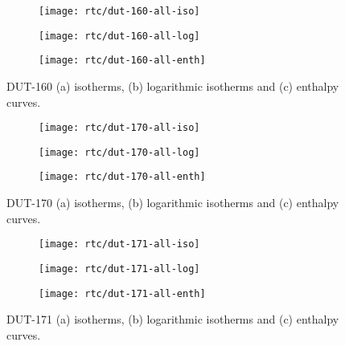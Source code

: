 \begin{figure}[H]
    \centering
    \begin{subfigure}{0.33\linewidth}
        \texttt{[image: rtc/dut-160-all-iso]}%
        \caption{}
    \end{subfigure}%
    \begin{subfigure}{0.33\linewidth}
        \texttt{[image: rtc/dut-160-all-log]}%
        \caption{}
    \end{subfigure}%
    \begin{subfigure}{0.33\linewidth}
        \texttt{[image: rtc/dut-160-all-enth]}%
        \caption{}
    \end{subfigure}%
    \caption{DUT-160 (a) isotherms, (b) logarithmic isotherms and 
    (c) enthalpy curves.}%
    \label{appx:dut:fig:dut-160-butane-rtc}
\end{figure}

\begin{figure}[H]
    \centering
    \begin{subfigure}{0.33\linewidth}
        \texttt{[image: rtc/dut-170-all-iso]}%
        \caption{}
    \end{subfigure}%
    \begin{subfigure}{0.33\linewidth}
        \texttt{[image: rtc/dut-170-all-log]}%
        \caption{}
    \end{subfigure}%
    \begin{subfigure}{0.33\linewidth}
        \texttt{[image: rtc/dut-170-all-enth]}%
        \caption{}
    \end{subfigure}%
    \caption{DUT-170 (a) isotherms, (b) logarithmic isotherms and 
    (c) enthalpy curves.}%
    \label{appx:dut:fig:dut-170-butane-rtc}
\end{figure}

\begin{figure}[H]
    \centering
    \begin{subfigure}{0.33\linewidth}
        \texttt{[image: rtc/dut-171-all-iso]}%
        \caption{}
    \end{subfigure}%
    \begin{subfigure}{0.33\linewidth}
        \texttt{[image: rtc/dut-171-all-log]}%
        \caption{}
    \end{subfigure}%
    \begin{subfigure}{0.33\linewidth}
        \texttt{[image: rtc/dut-171-all-enth]}%
        \caption{}
    \end{subfigure}%
    \caption{DUT-171 (a) isotherms, (b) logarithmic isotherms and 
    (c) enthalpy curves.}%
    \label{appx:dut:fig:dut-171-butane-rtc}
\end{figure}

